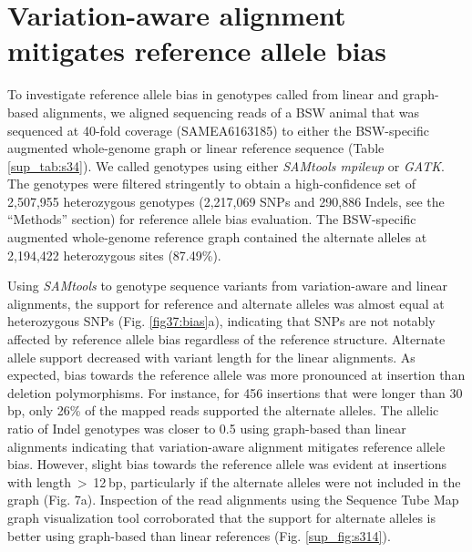 \documentclass[../main.tex]{subfiles}
\begin{document}
\section*{Variation-aware alignment mitigates reference allele bias}

To investigate reference allele bias in genotypes called from linear and graph-based alignments, we aligned sequencing reads of a BSW animal that was sequenced at 40-fold coverage (SAMEA6163185) to either the BSW-specific augmented whole-genome graph or linear reference sequence (Table \ref{sup_tab:s34}). We called genotypes using either \emph{SAMtools mpileup} or \emph{GATK}. The genotypes were filtered stringently to obtain a high-confidence set of 2,507,955 heterozygous genotypes (2,217,069 SNPs and 290,886 Indels, see the “Methods” section) for reference allele bias evaluation. The BSW-specific augmented whole-genome reference graph contained the alternate alleles at 2,194,422 heterozygous sites (87.49\%).

Using \emph{SAMtools} to genotype sequence variants from variation-aware and linear alignments, the support for reference and alternate alleles was almost equal at heterozygous SNPs (Fig. \ref{fig37:bias}a), indicating that SNPs are not notably affected by reference allele bias regardless of the reference structure. Alternate allele support decreased with variant length for the linear alignments. As expected, bias towards the reference allele was more pronounced at insertion than deletion polymorphisms. For instance, for 456 insertions that were longer than 30 bp, only 26\% of the mapped reads supported the alternate alleles. The allelic ratio of Indel genotypes was closer to 0.5 using graph-based than linear alignments indicating that variation-aware alignment mitigates reference allele bias. However, slight bias towards the reference allele was evident at insertions with length $>$ 12 bp, particularly if the alternate alleles were not included in the graph (Fig. 7a). Inspection of the read alignments using the Sequence Tube Map graph visualization tool \citep{beyer2019sequence} corroborated that the support for alternate alleles is better using graph-based than linear references (Fig. \ref{sup_fig:s314}).
\end{document}
